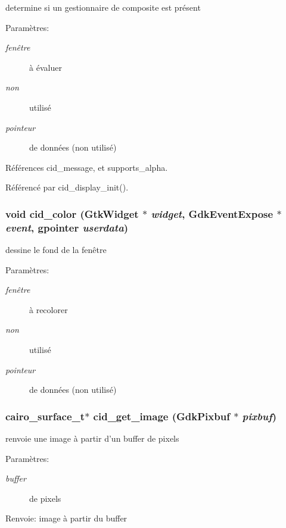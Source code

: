 determine si un gestionnaire de composite est présent \begin{Desc}
\item[Paramètres:]
\begin{description}
\item[{\em fenêtre}]à évaluer \item[{\em non}]utilisé \item[{\em pointeur}]de données (non utilisé) \end{description}
\end{Desc}


Références cid\_\-message, et supports\_\-alpha.

Référencé par cid\_\-display\_\-init().
\subsubsection{\setlength{\rightskip}{0pt plus 5cm}void cid\_\-color (GtkWidget $\ast$ {\em widget}, \/  GdkEventExpose $\ast$ {\em event}, \/  gpointer {\em userdata})}\label{cid-gtk_8h_819e1dd504e64514b481c238930a5152}


dessine le fond de la fenêtre \begin{Desc}
\item[Paramètres:]
\begin{description}
\item[{\em fenêtre}]à recolorer \item[{\em non}]utilisé \item[{\em pointeur}]de données (non utilisé) \end{description}
\end{Desc}
\subsubsection{\setlength{\rightskip}{0pt plus 5cm}cairo\_\-surface\_\-t$\ast$ cid\_\-get\_\-image (GdkPixbuf $\ast$ {\em pixbuf})}\label{cid-gtk_8h_25f30bf6387751fc1e2bc76d052998da}


renvoie une image à partir d'un buffer de pixels \begin{Desc}
\item[Paramètres:]
\begin{description}
\item[{\em buffer}]de pixels \end{description}
\end{Desc}
\begin{Desc}
\item[Renvoie:]image à partir du buffer \end{Desc}


